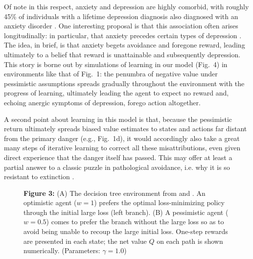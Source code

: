 \documentclass[11pt]{article} %
\begin{document}
Of note in this respect, anxiety and depression are highly comorbid, with roughly 45\% of individuals with a lifetime depression diagnosis also diagnosed with an anxiety disorder \citep{kessler2015}. One interesting proposal is that this association often arises longitudinally: in particular, that anxiety precedes certain types of depression \citep{alloy1990, jacobson2014}. The idea, in brief, is that anxiety begets avoidance and foregone reward, leading ultimately to a belief that reward is unattainable and subsequently depression. This story is borne out by simulations of learning in our model (Fig.~4) in environments like that of Fig.~1: the penumbra of negative value under pessimistic assumptions spreads gradually throughout the environment with the progress of learning, ultimately leading the agent to expect no reward and, echoing anergic symptoms of depression, forego action altogether.

A second point about learning in this model is that, because the pessimistic return ultimately spreads biased value estimates to states and actions far distant from the primary danger (e.g., Fig.~1d), it would accordingly also take a great many steps of iterative learning to correct all these misattributions, even given direct experience that the danger itself has passed. This may offer at least a partial answer to a classic puzzle in pathological avoidance, i.e. why it is so resistant to extinction \cite{moutoussis2018}.

\begin{figure}[!b]
  \centerline{%
  }
  \par \textbf{Figure 3:} (A) The decision tree environment from \cite{Huys2012} and \cite{Lally2017}. An optimistic agent ($w=1$) prefers the optimal loss-minimizing policy through the initial large loss (left branch). (B) A pessimistic agent ($w=0.5$) comes to prefer the branch without the large loss so as to avoid being unable to recoup the large initial loss. One-step rewards are presented in each state; the net value $Q$ on each path is shown numerically. (Parameters: $\gamma = 1.0$)
\end{figure}
\end{document}
